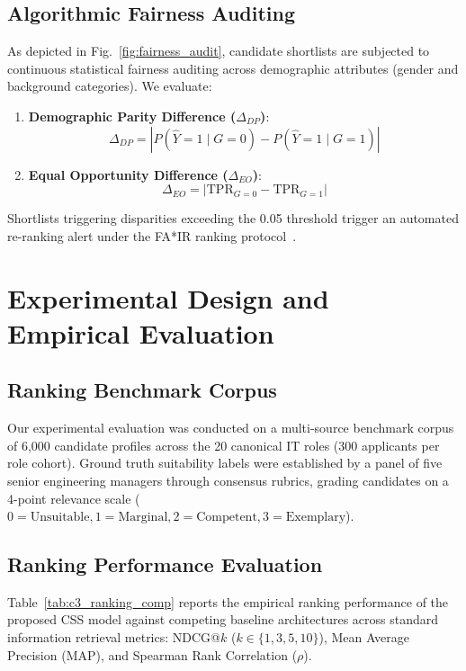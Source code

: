 \documentclass[conference]{IEEEtran}
\begin{document}
\subsection{Algorithmic Fairness Auditing}
As depicted in Fig.~\ref{fig:fairness_audit}, candidate shortlists are subjected to continuous statistical fairness auditing across demographic attributes (gender and background categories). We evaluate:
\begin{enumerate}
    \item \textbf{Demographic Parity Difference ($\Delta_{DP}$)}:
    \begin{equation}
    \Delta_{DP} = \left| P(\hat{Y} = 1 \mid G = 0) - P(\hat{Y} = 1 \mid G = 1) \right|
    \end{equation}
    \item \textbf{Equal Opportunity Difference ($\Delta_{EO}$)}:
    \begin{equation}
    \Delta_{EO} = \left| \text{TPR}_{G=0} - \text{TPR}_{G=1} \right|
    \end{equation}
\end{enumerate}
Shortlists triggering disparities exceeding the 0.05 threshold trigger an automated re-ranking alert under the FA*IR ranking protocol~\cite{zehlike2017fair}.

\section{Experimental Design and Empirical Evaluation}
\subsection{Ranking Benchmark Corpus}
Our experimental evaluation was conducted on a multi-source benchmark corpus of 6,000 candidate profiles across the 20 canonical IT roles (300 applicants per role cohort). Ground truth suitability labels were established by a panel of five senior engineering managers through consensus rubrics, grading candidates on a 4-point relevance scale ($0 = \text{Unsuitable}, 1 = \text{Marginal}, 2 = \text{Competent}, 3 = \text{Exemplary}$).

\subsection{Ranking Performance Evaluation}
Table~\ref{tab:c3_ranking_comp} reports the empirical ranking performance of the proposed CSS model against competing baseline architectures across standard information retrieval metrics: NDCG@$k$ ($k \in \{1, 3, 5, 10\}$), Mean Average Precision (MAP), and Spearman Rank Correlation ($\rho$).
\end{document}
